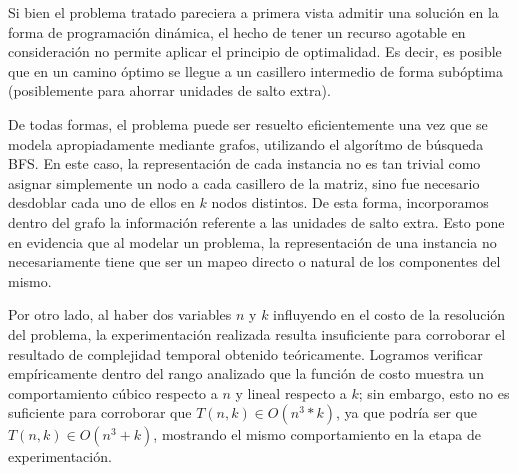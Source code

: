 Si bien el problema tratado pareciera a primera vista admitir una solución en la forma de programación dinámica, el hecho de tener un recurso agotable en consideración no permite aplicar el principio de optimalidad. Es decir, es posible que en un camino óptimo se llegue a un casillero intermedio de forma subóptima (posiblemente para ahorrar unidades de salto extra).

De todas formas, el problema puede ser resuelto eficientemente una vez que se modela apropiadamente mediante grafos, utilizando el algorítmo de búsqueda BFS. En este caso, la representación de cada instancia no es tan trivial como asignar simplemente un nodo a cada casillero de la matriz, sino fue necesario desdoblar cada uno de ellos en $k$ nodos distintos. De esta forma, incorporamos dentro del grafo la información referente a las unidades de salto extra. Esto pone en evidencia que al modelar un problema, la representación de una instancia no necesariamente tiene que ser un mapeo directo o natural de los componentes del mismo.

Por otro lado, al haber dos variables $n$ y $k$ influyendo en el costo de la resolución del problema, la experimentación realizada resulta insuficiente para corroborar el resultado de complejidad temporal obtenido teóricamente. Logramos verificar empíricamente dentro del rango analizado que la función de costo muestra un comportamiento cúbico respecto a $n$ y lineal respecto a $k$; sin embargo, esto no es suficiente para corroborar que $T(n,k) \in O(n^3 * k)$, ya que podría ser que $T(n,k) \in O(n^3 + k)$, mostrando el mismo comportamiento en la etapa de experimentación.